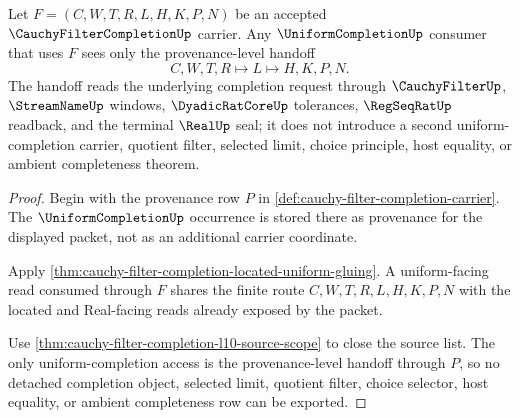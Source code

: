\begin{theorem}
\label{thm:cauchy-filter-completion-uniform-handoff}
Let $F=(C,W,T,R,L,H,K,P,N)$ be an accepted $\CauchyFilterCompletionUp$ carrier. Any $\UniformCompletionUp$ consumer that uses $F$ sees only the provenance-level handoff
$$
C,W,T,R \longmapsto L \longmapsto H,K,P,N .
$$
The handoff reads the underlying completion request through $\CauchyFilterUp$, $\StreamNameUp$ windows, $\DyadicRatCoreUp$ tolerances, $\RegSeqRatUp$ readback, and the terminal $\RealUp$ seal; it does not introduce a second uniform-completion carrier, quotient filter, selected limit, choice principle, host equality, or ambient completeness theorem.
\end{theorem}
\begin{proof}
Begin with the provenance row $P$ in \autoref{def:cauchy-filter-completion-carrier}. The $\UniformCompletionUp$ occurrence is stored there as provenance for the displayed packet, not as an additional carrier coordinate.

Apply \autoref{thm:cauchy-filter-completion-located-uniform-gluing}. A uniform-facing read consumed through $F$ shares the finite route $C,W,T,R,L,H,K,P,N$ with the located and Real-facing reads already exposed by the packet.

Use \autoref{thm:cauchy-filter-completion-l10-source-scope} to close the source list. The only uniform-completion access is the provenance-level handoff through $P$, so no detached completion object, selected limit, quotient filter, choice selector, host equality, or ambient completeness row can be exported.
\end{proof}

